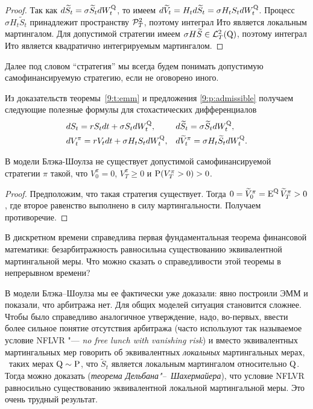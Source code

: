 \begin{proof}
Так как $d\tilde S_t = \sigma \tilde S_t dW_t^{\Q}$, то имеем $d\tilde V_t = H_t d\tilde S_t = \sigma H_t S_t dW_t^{\Q}$.
Процесс $\sigma H_t \tilde S_t$ принадлежит пространству $\PP^2_T$, поэтому интеграл Ито является локальным мартингалом.
Для допустимой стратегии имеем $\sigma H\tilde S \in \L^2_T(\Q)$, поэтому интеграл Ито является квадратично интегрируемым мартингалом.
\end{proof}

Далее под словом ``стратегия'' мы всегда будем понимать допустимую самофинансируемую стратегию, если не оговорено иного. 

\begin{remark}
Из доказательств теоремы~\ref{9:t:emm} и предложения \ref{9:p:admissible} получаем следующие полезные формулы для стохастических дифференциалов
\begin{align}
\label{9:S-dynamics}
&d S_t = rS_t dt + \sigma S_t d W_t^{\Q},& 
  &d \tilde S_t = \sigma \tilde S_t d W_t^{\Q},\\
\label{9:V-dynamics}
&d V_t^\pi = r V_t dt + \sigma H_t S_t d W_t^{\Q},&
  &d \tilde V_t^\pi = \sigma H_t \tilde S_t d W_t^{\Q}.
\end{align}
\end{remark}

\begin{proposition}
В модели Блэка-Шоулза не существует допустимой самофинансируемой стратегии $\pi$ такой, что $V_0^\pi = 0$, $V_T^\pi \ge 0$ и $\P(V_T^\pi > 0) > 0$.
\end{proposition}

\begin{proof}
Предположим, что такая стратегия существует.
Тогда $0 = \tilde V_0^\pi = \E^{\Q} \tilde V_T^\pi > 0$,
где второе равенство выполнено в силу мартингальности. Получаем противоречие.
\end{proof}

\begin{remark}
В дискретном времени справедлива первая фундаментальная теорема финансовой математики: безарбитражность равносильна существованию эквивалентной мартингальной меры.
Что можно сказать о справедливости этой теоремы в непрерывном времени? 

В модели Блэка--Шоулза мы ее фактически уже доказали: явно построили ЭММ и показали, что арбитража нет.
Для общих моделей ситуация становится сложнее.
Чтобы было справедливо аналогичное утверждение, надо, во-первых, ввести более сильное понятие отсутствия арбитража (часто используют так называемое условие NFLVR "--- \emph{no free lunch with vanishing risk}) и вместо эквивалентных мартингальных мер говорить об эквивалентных \emph{локальных} мартингальных мерах, \te\ таких мерах $\Q\sim\P$, что $\tilde S_t$ является локальным мартингалом относительно $\Q$.
Тогда можно доказать (\emph{теорема Дельбана"--~Шахермайера}), что условие NFLVR равносильно существованию эквивалентной локальной мартингальной меры.
Это очень трудный результат. 
\end{remark}

